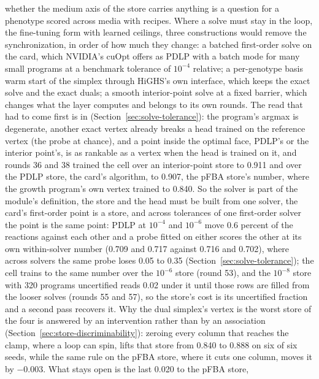 \begin{itemize}
    whether the medium axis of the store carries anything is a question for a
    phenotype scored across media with recipes.
    Where a solve must stay in the loop, the fine-tuning form with learned ceilings,
    three constructions would remove the synchronization, in order of how much they
    change: a batched first-order solve on the card, which NVIDIA's cuOpt offers as
    PDLP with a batch mode for many small programs at a benchmark tolerance of
    $10^{-4}$ relative; a per-genotype basis warm start of the simplex through HiGHS's
    own interface, which keeps the exact solve and the exact duals; a smooth
    interior-point solve at a fixed barrier, which changes what the layer computes
    and belongs to its own rounds. The read that had to come first is in
    (Section~\ref{sec:solve-tolerance}): the program's argmax is degenerate, another
    exact vertex already breaks a head trained on the reference vertex (the probe at
    chance), and a point inside the optimal face, PDLP's or the interior point's, is
    as rankable as a vertex when the head is trained on it, and rounds 36 and 38
    trained the cell over an interior-point store to 0.911 and over the PDLP store,
    the card's algorithm, to 0.907, the pFBA store's number, where the growth
    program's own vertex trained to 0.840. So the solver is part of the module's
    definition, the store and the head must be built from one solver, the card's
    first-order point is a store, and across tolerances of one first-order solver
    the point is the same point: PDLP at $10^{-4}$ and $10^{-6}$ move 0.6 percent of
    the reactions against each other and a probe fitted on either scores the other
    at its own within-solver number (0.709 and 0.717 against 0.716 and 0.702), where
    across solvers the same probe loses 0.05 to 0.35 (Section~\ref{sec:solve-tolerance});
    the cell trains to the same number over the $10^{-6}$ store (round 53), and the
    $10^{-8}$ store with 320 programs uncertified reads 0.02 under it until those rows
    are filled from the looser solves (rounds 55 and 57), so the store's cost is its
    uncertified fraction and a second pass recovers it. Why the dual simplex's vertex is
    the worst store of the four is answered by an intervention rather than by an
    association (Section~\ref{sec:store-discriminability}): zeroing every column that
    reaches the clamp, where a loop can spin, lifts that store from 0.840 to 0.888 on
    six of six seeds, while the same rule on the pFBA store, where it cuts one column,
    moves it by $-0.003$. What stays open is the last 0.020 to the pFBA store,

\end{itemize}
